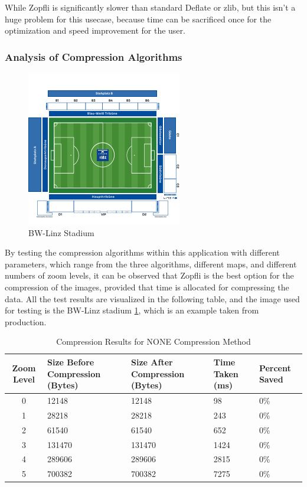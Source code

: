 While Zopfli is significantly slower than standard Deflate or zlib, but this isn't a huge problem for this usecase, because time can be sacrificed once for the optimization and speed improvement for the user.

\subsubsection{Analysis of Compression Algorithms}

\begin{figure}
    \centering
    \includegraphics[scale=0.8]{pics/test_stadium.png}
    \caption{BW-Linz Stadium}
    \label{fig:impl:bw-stadium}
\end{figure}

By testing the compression algorithms within this application with different parameters, which range from the three algorithms, different maps, and different numbers of zoom levels, it can be observed that Zopfli is the best option for the compression of the images, provided that time is allocated for compressing the data. All the test results are visualized in the following table, and the image used for testing is the BW-Linz stadium \ref{fig:impl:bw-stadium}, which is an example taken from production.

\begin{table}[h]
    \centering
    \begin{tabularx}{\textwidth}{|c|X|X|X|X|}
        \hline
        \textbf{Zoom Level} & \textbf{Size Before Compression (Bytes)} & \textbf{Size After Compression (Bytes)} & \textbf{Time Taken (ms)} & \textbf{Percent Saved} \\ \hline
        0 & 12148 & 12148 & 98 & 0\% \\ \hline
        1 & 28218 & 28218 & 243 & 0\% \\ \hline
        2 & 61540 & 61540 & 652 & 0\% \\ \hline
        3 & 131470 & 131470 & 1424 & 0\% \\ \hline
        4 & 289606 & 289606 & 2815 & 0\% \\ \hline
        5 & 700382 & 700382 & 7275 & 0\% \\ \hline
    \end{tabularx}
    \caption{Compression Results for NONE Compression Method}
    \label{tab:compression_none}
\end{table}

